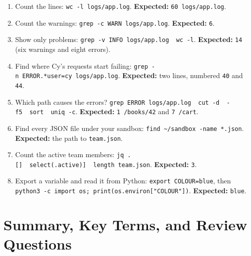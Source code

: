 \begin{enumerate}
\def\labelenumi{\arabic{enumi}.}
\tightlist
\item
  Count the lines: \texttt{wc\ -l\ logs/}\allowbreak{}\texttt{app.log}. \textbf{Expected:} \texttt{60\ logs/app.log}.
\item
  Count the warnings: \texttt{grep\ -}\allowbreak{}\texttt{c\ WARN\ logs/}\allowbreak{}\texttt{app.}\allowbreak{}\texttt{log}. \textbf{Expected:} \texttt{6}.
\item
  Show only problems: \texttt{grep\ -}\allowbreak{}\texttt{v\ INFO\ logs/}\allowbreak{}\texttt{app.}\allowbreak{}\texttt{log\ \textbar{}\ wc\ -}\allowbreak{}\texttt{l}. \textbf{Expected:} \texttt{14} (six warnings and eight errors).
\item
  Find where Cy's requests start failing: \texttt{grep\ -}\allowbreak{}\texttt{n\ \textquotesingle{}ERROR.}\allowbreak{}\texttt{*user=}\allowbreak{}\texttt{cy\textquotesingle{}\ logs/}\allowbreak{}\texttt{app.}\allowbreak{}\texttt{log}. \textbf{Expected:} two lines, numbered \texttt{40} and \texttt{44}.
\item
  Which path causes the errors? \texttt{grep\ ERROR\ logs/}\allowbreak{}\texttt{app.}\allowbreak{}\texttt{log\ \textbar{}\ cut\ -}\allowbreak{}\texttt{d\textquotesingle{}\ \textquotesingle{}\ -}\allowbreak{}\texttt{f5\ \textbar{}\ sort\ \textbar{}\ uniq\ -}\allowbreak{}\texttt{c}. \textbf{Expected:} \texttt{1\ /books/42} and \texttt{7\ /cart}.
\item
  Find every JSON file under your sandbox: \texttt{find\ \textasciitilde{}/}\allowbreak{}\texttt{sandbox\ -}\allowbreak{}\texttt{name\ \textquotesingle{}*.}\allowbreak{}\texttt{json\textquotesingle{}}. \textbf{Expected:} the path to \texttt{team.json}.
\item
  Count the active team members: \texttt{jq\ \textquotesingle{}{[}.}\allowbreak{}\texttt{{[}{]}\ \textbar{}\ select(.}\allowbreak{}\texttt{active){]}\ \textbar{}\ length\textquotesingle{}\ team.}\allowbreak{}\texttt{json}. \textbf{Expected:} \texttt{3}.
\item
  Export a variable and read it from Python: \texttt{export\ COLOUR=}\allowbreak{}\texttt{blue}, then \texttt{python3\ -}\allowbreak{}\texttt{c\ \textquotesingle{}import\ os;\ print(os.}\allowbreak{}\texttt{environ{[}"COLOUR"{]})\textquotesingle{}}. \textbf{Expected:} \texttt{blue}.
\end{enumerate}

\section{Summary, Key Terms, and Review Questions}\label{05-the-everyday-command-line:summary-key-terms-and-review-questions}

